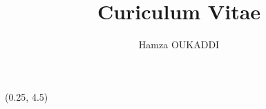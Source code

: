 \documentclass[a4paper]{hamza-cv}
\title{Curiculum Vitae}
\author{Hamza OUKADDI}
\begin{document}
\makeprofile %

\begin{textblock}{20.5}(0.25, 4.5)

  \begin{minipage}[t]{0.37\textwidth}





    

\end{minipage}
\end{textblock}
\end{document}
